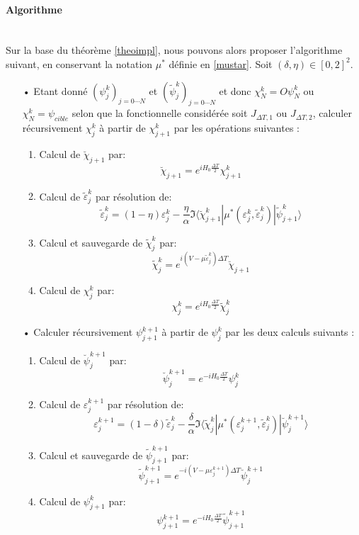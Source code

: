 \paragraph*{Algorithme}
$ $\\Sur la base du théorème \ref{theoimpl}, nous pouvons alors proposer l'algorithme suivant, en conservant la notation $\mu^*$ définie en \eqref{mustar}. Soit $(\delta, \eta) \in [0, 2]^2$.

\begin{itemize}
	
	\item[•] Etant donné $ (\psi^k_j)_{j=0\cdots N}$ et $ (\tilde{\psi}^k_j)_{j=0\cdots N}$ et donc $\chi^k_N = O\psi^k_N$ ou $ \chi_N^k = \psi_{cible} $ selon que la
	fonctionnelle considérée soit $J_{\Delta T,1}$ ou $J_{\Delta T,2}$, calculer récursivement $\chi_j^k$ à partir de $ \chi^k_{j+1} $ par les opérations suivantes :
	
	\begin{enumerate}
		\item Calcul de $\breve{\chi}_{j+1}$ par:
		$$ \breve{\chi}_{j+1} = e^{iH_0\frac{\Delta T}{2}} \chi^k_{j+1} $$
		\item Calcul de $\tilde{\varepsilon}_j^k$ par résolution de:
		\begin{equation} \label{implepst}
		\tilde{\varepsilon}_j^k = (1-\eta)\varepsilon^k_j - \frac{\eta}{\alpha}\Im \langle  \breve{\chi}^k_{j+1}|\mu^*(\varepsilon^k_j,\tilde{\varepsilon}^k_j)|\tilde{\psi}^k_{j+1} \rangle
		\end{equation}
		\item Calcul et sauvegarde de $\tilde{\chi}^k_j$ par:
		$$ \tilde{\chi}^k_j = e^{i(V-\mu \tilde{\varepsilon}^k_j)\Delta T} \breve{\chi}_{j+1} $$
		\item Calcul de $\chi^k_j$ par:
		$$ \chi^k_j = e^{iH_0\frac{\Delta T}{2}} \tilde{\chi}_j^k  $$
	\end{enumerate}
	
	\item[•] Calculer récursivement $ \psi^{k+1}_{j+1}$ à partir de $\psi_j^k$ par les deux calculs suivants :
	
	\begin{enumerate}
		\item Calcul de $\breve{\psi}_j^{k+1}$ par:
		$$ \breve{\psi}_j^{k+1} = e^{-iH_0\frac{\Delta T}{2}} \psi^k_j $$
		\item Calcul de $\varepsilon_j^{k+1}$ par résolution de:
		\begin{equation} \label{impleps}
		\varepsilon_j^{k+1} = (1-\delta)\tilde{\varepsilon}^k_j - \frac{\delta}{\alpha}\Im \langle  \tilde{\chi}^k_{j}|\mu^*(\varepsilon^{k+1}_j,\tilde{\varepsilon}^k_j)|\breve{\psi}^{k+1}_{j} \rangle
		\end{equation}
		\item Calcul et sauvegarde de $\tilde{\psi}^{k+1}_{j+1}$ par:
		$$ \tilde{\psi}^{k+1}_{j+1} = e^{-i(V-\mu \varepsilon_j^{k+1})\Delta T} \breve{\psi}_j^{k+1}  $$
		\item Calcul de $\psi^k_{j+1}$ par:
		$$ \psi^{k+1}_{j+1} = e^{-iH_0\frac{\Delta T}{2}} \tilde{\psi}^{k+1}_{j+1} $$
		

\end{enumerate}
\end{itemize}
